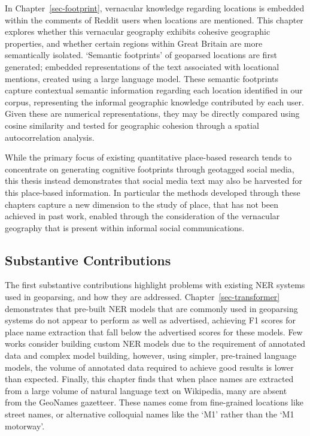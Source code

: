 \documentclass[
  letterpaper,
  11pt,
  english,
  onehalfspacing,
  headsepline]{MastersDoctoralThesis}
\begin{document}
In Chapter~\ref{sec-footprint}, vernacular knowledge regarding locations
is embedded within the comments of Reddit users when locations are
mentioned. This chapter explores whether this vernacular geography
exhibits cohesive geographic properties, and whether certain regions
within Great Britain are more semantically isolated. `Semantic
footprints' of geoparsed locations are first generated; embedded
representations of the text associated with locational mentions, created
using a large language model. These semantic footprints capture
contextual semantic information regarding each location identified in
our corpus, representing the informal geographic knowledge contributed
by each user. Given these are numerical representations, they may be
directly compared using cosine similarity and tested for geographic
cohesion through a spatial autocorrelation analysis.

While the primary focus of existing quantitative place-based research
tends to concentrate on generating cognitive footprints through
geotagged social media, this thesis instead demonstrates that social
media text may also be harvested for this place-based information. In
particular the methods developed through these chapters capture a new
dimension to the study of place, that has not been achieved in past
work, enabled through the consideration of the vernacular geography that
is present within informal social communications.

\hypertarget{substantive-contributions}{%
\subsection{Substantive Contributions}\label{substantive-contributions}}

The first substantive contributions highlight problems with existing NER
systems used in geoparsing, and how they are addressed.
Chapter~\ref{sec-transformer} demonstrates that pre-built NER models
that are commonly used in geoparsing systems do not appear to perform as
well as advertised, achieving F1 scores for place name extraction that
fall below the advertised scores for these models. Few works consider
building custom NER models due to the requirement of annotated data and
complex model building, however, using simpler, pre-trained language
models, the volume of annotated data required to achieve good results is
lower than expected. Finally, this chapter finds that when place names
are extracted from a large volume of natural language text on Wikipedia,
many are absent from the GeoNames gazetteer. These names come from
fine-grained locations like street names, or alternative colloquial
names like the `M1' rather than the `M1 motorway'.
\end{document}
